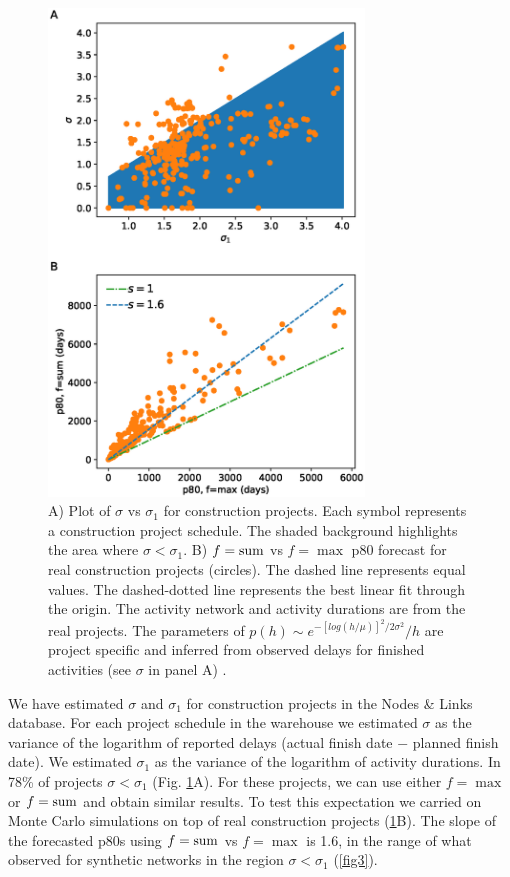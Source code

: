 \documentclass[reprint,aps,prl,amsmath,amssymb,superscriptaddress,showpacs]{revtex4-1}
\begin{document}
\begin{figure}[t]
\includegraphics[width=3.3in]{fig.sigma_vs_sigma1.eps}
\caption{A) Plot of $\sigma$ vs $\sigma_1$ for construction projects. Each symbol represents a construction project schedule. The shaded background highlights the area where $\sigma<\sigma_1$. B) $f={\rm sum}$ vs $f=\max$ p80 forecast for real construction projects (circles). The dashed line represents equal values. The dashed-dotted line represents the best linear fit through the origin. The activity network and activity durations are from the real projects. The parameters of $p(h)\sim e^{-[log(h/\mu)]^2/2\sigma^2}/h$ are project specific and inferred from observed delays for finished activities (see $\sigma$ in panel A) .}
\label{fig4}
\end{figure}

We have estimated $\sigma$ and $\sigma_1$ for construction projects in the Nodes \& Links database. For each project schedule in the warehouse we estimated $\sigma$ as the variance of the logarithm of reported delays (actual finish date $-$ planned finish date). We estimated $\sigma_1$ as the variance of the logarithm of activity durations. In 78\% of projects $\sigma<\sigma_1$ (Fig. \ref{fig4}A). For these projects, we can use either $f={\max}$ or $f={\rm sum}$ and obtain similar results. To test this expectation we carried on Monte Carlo simulations on top of real construction projects (\ref{fig4}B). The slope of the forecasted p80s using $f={\rm sum}$ vs $f=\max$ is 1.6, in the range of what observed for synthetic networks in the region $\sigma<\sigma_1$ (\ref{fig3}).
\end{document}
